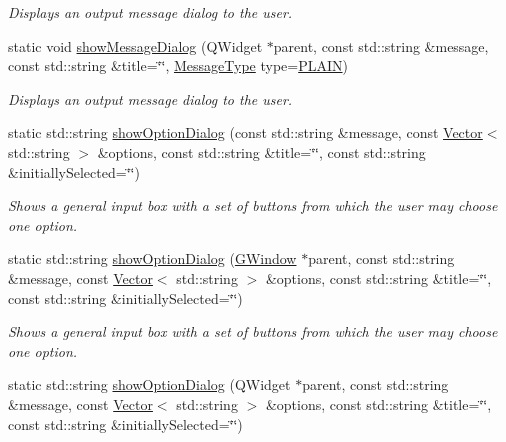 \begin{DoxyCompactItemize}
\begin{DoxyCompactList}\small\item\em Displays an output message dialog to the user. \end{DoxyCompactList}\item 
static void \mbox{\hyperlink{classGOptionPane_a98590e47196bf04738c2b97e9b7f6d0b}{show\+Message\+Dialog}} (Q\+Widget $\ast$parent, const std\+::string \&message, const std\+::string \&title=\char`\"{}\char`\"{}, \mbox{\hyperlink{classGOptionPane_ac6606ebe91c8ac66a2c314c79f5ab013}{Message\+Type}} type=\mbox{\hyperlink{classGOptionPane_ac6606ebe91c8ac66a2c314c79f5ab013a8386f3e3e7be0b7b603636867c133a5d}{P\+L\+A\+IN}})
\begin{DoxyCompactList}\small\item\em Displays an output message dialog to the user. \end{DoxyCompactList}\item 
static std\+::string \mbox{\hyperlink{classGOptionPane_ab97ebcd9d5b5827fbb9292b7c045c72f}{show\+Option\+Dialog}} (const std\+::string \&message, const \mbox{\hyperlink{classVector}{Vector}}$<$ std\+::string $>$ \&options, const std\+::string \&title=\char`\"{}\char`\"{}, const std\+::string \&initially\+Selected=\char`\"{}\char`\"{})
\begin{DoxyCompactList}\small\item\em Shows a general input box with a set of buttons from which the user may choose one option. \end{DoxyCompactList}\item 
static std\+::string \mbox{\hyperlink{classGOptionPane_a611d2c1c7209b39b3c74d9039c28821c}{show\+Option\+Dialog}} (\mbox{\hyperlink{classGWindow}{G\+Window}} $\ast$parent, const std\+::string \&message, const \mbox{\hyperlink{classVector}{Vector}}$<$ std\+::string $>$ \&options, const std\+::string \&title=\char`\"{}\char`\"{}, const std\+::string \&initially\+Selected=\char`\"{}\char`\"{})
\begin{DoxyCompactList}\small\item\em Shows a general input box with a set of buttons from which the user may choose one option. \end{DoxyCompactList}\item 
static std\+::string \mbox{\hyperlink{classGOptionPane_ae710ab30d0f4995523abed1180559d35}{show\+Option\+Dialog}} (Q\+Widget $\ast$parent, const std\+::string \&message, const \mbox{\hyperlink{classVector}{Vector}}$<$ std\+::string $>$ \&options, const std\+::string \&title=\char`\"{}\char`\"{}, const std\+::string \&initially\+Selected=\char`\"{}\char`\"{})

\end{DoxyCompactItemize}
